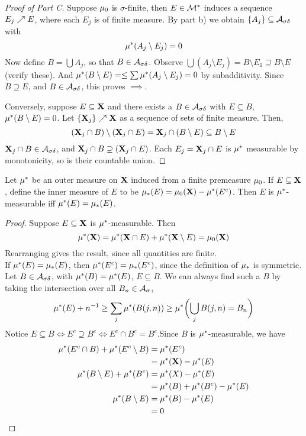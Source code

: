 \documentclass[../../main.tex]{subfiles}
\begin{document}
\begin{proof}[Proof of Part C]
    Suppose $\mu_0$ is $\sigma$-finite, then $E\in\mathcal{M}^*$ induces a sequence $E_j\nearrow E$, where each $E_j$ is of finite measure. By part b) we obtain $\{A_j\}\subseteq\mathcal{A}_{\sigma\delta}$ with 
    \[
        \mu^*(A_j\setminus E_j) = 0
    \]
    Now define $B = \bigcup A_j$, so that $B\in \mathcal{A}_{\sigma\delta}$. Observe $\bigcup(A_j\setminus E_j) = B\setminus E_1 \supseteq B\setminus E$ (verify these). And $\mu^*(B\setminus E)=\leq \sum \mu^*(A_j\setminus E_j)=0$ by subadditivity. Since $B\supseteq E$, and $B\in\mathcal{A}_{\sigma\delta}$, this proves $\implies$.

    Conversely, suppose $E\subseteq{\mathbf{X}}$ and there exists a $B\in\mathcal{A}_{\sigma\delta}$ with $E\subseteq B$, $\mu^*(B\setminus E) = 0$. Let $\{{\mathbf{X}}_j\}\nearrow{\mathbf{X}}$ as a sequence of sets of finite measure. Then,
    \[
    ({\mathbf{X}}_j\cap B)\setminus({\mathbf{X}}_j\cap E) = {\mathbf{X}}_j\cap (B\setminus E)\subseteq B\setminus E
    \]
    ${\mathbf{X}}_j\cap B\in\mathcal{A}_{\sigma\delta}$, and ${\mathbf{X}}_j\cap B\supseteq ({\mathbf{X}}_j\cap E)$. Each $E_j = {\mathbf{X}}_j\cap E$ is $\mu^*$ measurable by monotonicity, so is their countable union.
\end{proof}
\newpage


\begin{wts}
    Let $\mu^*$ be an outer measure on ${\mathbf{X}}$ induced from a finite premeasure $\mu_0$. If $E\subseteq{\mathbf{X}}$, define the inner measure of $E$ to be $\mu_*(E) = \mu_0({\mathbf{X}}) - \mu^*(E^c)$. Then $E$ is $\mu^*$-measurable iff $\mu^*(E)=\mu_*(E)$.
\end{wts}
\begin{proof}
    Suppose $E\subseteq{\mathbf{X}}$ is $\mu^*$-measurable. Then
    \[
        \mu^*({\mathbf{X}}) = \mu^*({\mathbf{X}}\cap E) + \mu^*({\mathbf{X}}\setminus E) = \mu_0({\mathbf{X}})
    \]
    Rearranging gives the result, since all quantities are finite.\\

    If $\mu^*(E) = \mu_*(E)$, then $\mu^*(E^c) = \mu_*(E^c)$, since the definition of $\mu_*$ is symmetric. Let $B\in\mathcal{A}_{\sigma\delta}$, with $\mu^*(B) = \mu^*(E)$, $E\subseteq B$. We can always find such a $B$ by taking the intersection over all $B_n\in\mathcal{A}_{\sigma}$,
    \[
        \mu^*(E) + n^{-1}\geq \sum_j \mu^*(B(j,n))\geq \mu^*\biggl( {\bigcup_j B(j,n) = B_n}\biggr)
    \]
    Notice $E\subseteq B\iff E^c\supseteq B^c\iff E^c\cap B^c = B^c$.Since $B$ is $\mu^*$-measurable, we have
    \begin{align*}
        \mu^*(E^c\cap B) + \mu^*(E^c\setminus B) &=\mu^*(E^c)\\
        &= \mu^*({\mathbf{X}}) - \mu^*(E)\\
        \mu^*(B\setminus E) + \mu^*(B^c) &= \mu^*(X) - \mu^*(E)\\
        &= \mu^*(B) + \mu^*(B^c) - \mu^*(E)\\
        \mu^*(B\setminus E) &= \mu^*(B) - \mu^*(E)\\
        &= 0
    \end{align*}
\end{proof}
\newpage
\end{document}
